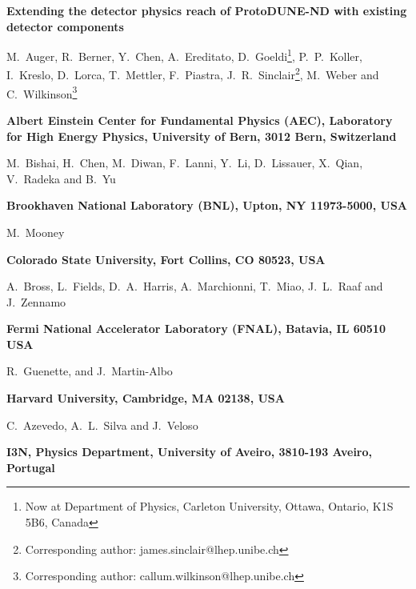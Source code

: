 \documentclass[a4paper]{article}
\begin{document}
\begin{center}
		
	{\Large \bf Extending the detector physics reach of ProtoDUNE-ND with existing detector components} 
	\vspace*{0.5cm}
	\setcounter{footnote}{0}  
	\def\A{\kern+.6ex\lower.42ex\hbox{$\scriptstyle \iota$}\kern-1.20ex a}
	\def\E{\kern+.5ex\lower.42ex\hbox{$\scriptstyle \iota$}\kern-1.10ex e}
	\small
	\newcommand{\Aname}[2]{#1}
	\def\titlefoot#1{\vspace{-0.3cm}\begin{center}{\bf #1}\end{center}}
	
	\Aname{M.~Auger}{Bern},
	\Aname{R.~Berner}{Bern},
	\Aname{Y.~Chen}{Bern},
	\Aname{A.~Ereditato}{Bern},
	\Aname{D.~Goeldi\footnote{Now at Department of Physics, Carleton University, Ottawa, Ontario, K1S 5B6, Canada}}{Bern},
	\Aname{P.~P.~Koller}{Bern},
	\Aname{I.~Kreslo}{Bern},
	\Aname{D.~Lorca}{Bern},
	\Aname{T.~Mettler}{Bern},
	\Aname{F.~Piastra}{Bern},
	\Aname{J.~R.~Sinclair\footnote{Corresponding author: james.sinclair@lhep.unibe.ch}}{Bern},
	\Aname{M.~Weber}{Bern} and
	\Aname{C.~Wilkinson\footnote{Corresponding author: callum.wilkinson@lhep.unibe.ch}}{Bern}
	\titlefoot{Albert Einstein Center for Fundamental Physics (AEC), Laboratory for High Energy Physics, University of Bern, 3012 Bern, Switzerland\label{Bern}}
	
	\Aname{M.~Bishai}{BNL},
	\Aname{H.~Chen}{BNL},
	\Aname{M.~Diwan}{BNL},
	\Aname{F.~Lanni}{BNL},
	\Aname{Y.~Li}{BNL},
	\Aname{D.~Lissauer}{BNL},
	\Aname{X.~Qian}{BNL},
	\Aname{V.~Radeka}{BNL} and
	\Aname{B.~Yu}{BNL}
	\titlefoot{Brookhaven National Laboratory (BNL), Upton, NY 11973-5000, USA\label{BNL}}
	
	\Aname{M.~Mooney}{Colorado}
	\titlefoot{Colorado State University, Fort Collins, CO 80523, USA\label{colorado}}
	
	\Aname{A.~Bross}{FNAL},
	\Aname{L.~Fields}{FNAL},
	\Aname{D.~A.~Harris}{FNAL},
	\Aname{A.~Marchionni}{FNAL},
	\Aname{T.~Miao}{FNAL},
	\Aname{J.~L.~Raaf}{FNAL} and
	\Aname{J.~Zennamo}{FNAL}
	\titlefoot{Fermi National Accelerator Laboratory (FNAL), Batavia, IL 60510 USA\label{FNAL}}
	
	\Aname{R.~Guenette}{Harvard}, and
	\Aname{J.~Martin-Albo}{Harvard}
	\titlefoot{Harvard University, Cambridge, MA 02138, USA\label{Harvard}}
	
	\Aname{C.~Azevedo}{I3N},
	\Aname{A.~L.~Silva}{I3N} and
	\Aname{J.~Veloso}{I3N}
	\titlefoot{I3N, Physics Department, University of Aveiro, 3810-193 Aveiro, Portugal\label{I3N}}
	

\end{center}
\end{document}

